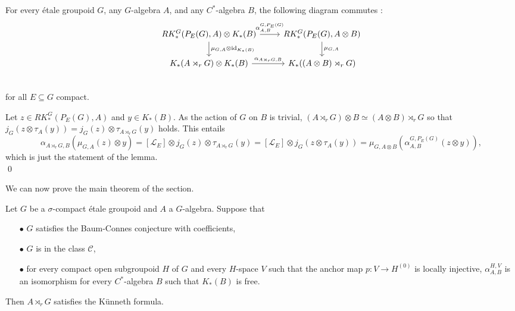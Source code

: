 \begin{lem}\label{KunnethLemma}
For every étale groupoid $G$, any $G$-algebra $A$, and any $C^*$-algebra $B$, the following diagram commutes :
\[\begin{tikzcd}
RK_*^G(P_E(G),A)\otimes K_*(B) \arrow{r}{\alpha^{G,P_E(G)}_{A,B}}\arrow{d}{\mu_{G,A}\otimes \text{id}_{K_*(B)}} & 
RK_*^G(P_E(G),A\otimes B) \arrow{d}{\mu_{G,A}} \\
K_*(A\rtimes_r G)\otimes K_*(B) \arrow{r}{\alpha_{A\rtimes_r G,B}} & 
K_*((A\otimes B)\rtimes_r G)\\
\end{tikzcd}\] 
for all $E\subseteq G$ compact. 
\end{lem}

\begin{dem}
Let $z\in RK_*^G(P_E(G),A)$ and $y\in K_*(B)$. As the action of $G$ on $B$ is trivial, $(A\rtimes_r G)\otimes B\simeq (A\otimes B)\rtimes_r G$ so that $j_G(z \otimes \tau_A(y))= j_G(z) \otimes \tau_{A\rtimes_r G}(y)$ holds. This entails
\[\alpha_{A\rtimes_r G, B}(\mu_{G,A}(z)\otimes y)= [\mathcal L_E] \otimes j_G(z)\otimes \tau_{A\rtimes_r G}(y) = 
[\mathcal L_E] \otimes j_G( z\otimes \tau_A(y) ) = \mu_{G,A\otimes B}(\alpha^{G,P_E(G)}_{A,B}(z\otimes y)) ,\]
which is just the statement of the lemma.\\
\qed
\end{dem}

We can now prove the main theorem of the section.

\begin{thm}\label{Kunneth}
Let $G$ be a $\sigma$-compact étale groupoid and $A$ a $G$-algebra. Suppose that 
\begin{itemize}
\item[$\bullet$] $G$ satisfies the Baum-Connes conjecture with coefficients,
\item[$\bullet$] $G$ is in the class $\mathcal C$,
\item[$\bullet$] for every compact open subgroupoid $H$ of $G$ and every $H$-space $V$ such that the anchor map $p : V \rightarrow H^{(0)}$ is locally injective, $\alpha_{A,B}^{H,V}$ is an isomorphism for every $C^*$-algebra $B$ such that $K_*(B)$ is free.
\end{itemize} 
Then $A\rtimes_r G$ satisfies the Künneth formula.
\end{thm}

